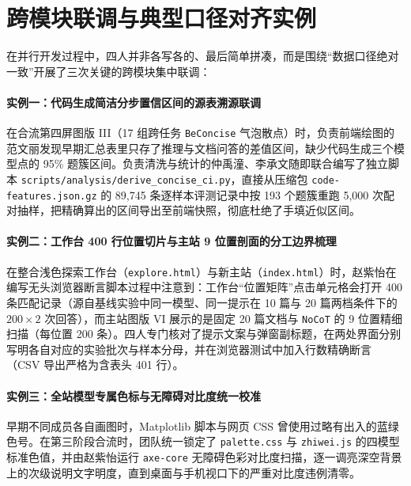 \section{跨模块联调与典型口径对齐实例}

在并行开发过程中，四人并非各写各的、最后简单拼凑，而是围绕“数据口径绝对一致”开展了三次关键的跨模块集中联调：

\paragraph{实例一：代码生成简洁分步置信区间的源表溯源联调}在合流第四屏图版 III（17 组跨任务 \texttt{BeConcise} 气泡散点）时，负责前端绘图的范文丽发现早期汇总表里只存了推理与文档问答的差值区间，缺少代码生成三个模型点的 95\% 题簇区间。负责清洗与统计的仲禹潼、李承文随即联合编写了独立脚本 \texttt{scripts/analysis/derive\_concise\_ci.py}，直接从压缩包 \texttt{code-features.json.gz} 的 89,745 条逐样本评测记录中按 193 个题簇重跑 5,000 次配对抽样，把精确算出的区间导出至前端快照，彻底杜绝了手填近似区间。

\paragraph{实例二：工作台 400 行位置切片与主站 9 位置剖面的分工边界梳理}在整合浅色探索工作台（\texttt{explore.html}）与新主站（\texttt{index.html}）时，赵紫怡在编写无头浏览器断言脚本过程中注意到：工作台“位置矩阵”点击单元格会打开 400 条匹配记录（源自基线实验中同一模型、同一提示在 10 篇与 20 篇两档条件下的 $200\times 2$ 次回答），而主站图版 VI 展示的是固定 20 篇文档与 \texttt{NoCoT} 的 9 位置精细扫描（每位置 200 条）。四人专门核对了提示文案与弹窗副标题，在两处界面分别写明各自对应的实验批次与样本分母，并在浏览器测试中加入行数精确断言（CSV 导出严格为含表头 401 行）。

\paragraph{实例三：全站模型专属色标与无障碍对比度统一校准}早期不同成员各自画图时，Matplotlib 脚本与网页 CSS 曾使用过略有出入的蓝绿色号。在第三阶段合流时，团队统一锁定了 \texttt{palette.css} 与 \texttt{zhiwei.js} 的四模型标准色值，并由赵紫怡运行 \texttt{axe-core} 无障碍色彩对比度扫描，逐一调亮深空背景上的次级说明文字明度，直到桌面与手机视口下的严重对比度违例清零。
